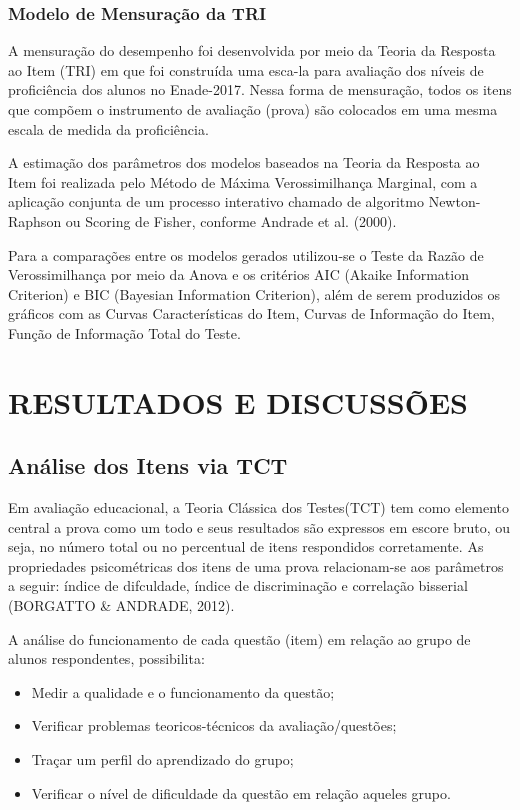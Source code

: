 \documentclass[12pt]{article}
\begin{document}
\subsubsection{Modelo de Mensuração da TRI}

A mensuração do desempenho foi desenvolvida por meio da Teoria da Resposta ao Item (TRI) em que foi construída uma esca-la para avaliação dos níveis de proficiência dos alunos no Enade-2017. Nessa forma de mensuração, todos os itens que compõem o instrumento de avaliação (prova) são colocados em uma mesma escala de medida da proficiência.

A estimação dos parâmetros dos modelos baseados na Teoria da Resposta ao Item foi realizada pelo Método de Máxima Verossimilhança Marginal, com a aplicação conjunta de um processo interativo chamado de algoritmo Newton-Raphson ou Scoring de Fisher, conforme Andrade et al. (2000).\vskip0.3cm

Para a comparações entre os modelos gerados utilizou-se o Teste da Razão de Verossimilhança por meio da Anova e os critérios AIC (Akaike Information Criterion) e BIC (Bayesian Information Criterion), além de serem produzidos os gráficos com as Curvas Características do Item, Curvas de Informação do Item, Função de Informação Total do Teste.\vskip0.3cm







\section{RESULTADOS E DISCUSSÕES}
\subsection{Análise dos Itens via TCT}

Em avaliação educacional, a Teoria Clássica dos Testes(TCT) tem como elemento central a prova como um todo e seus resultados são expressos em escore bruto, ou seja, no número total ou no percentual de itens respondidos corretamente. As propriedades psicométricas dos itens de uma prova relacionam-se aos parâmetros a seguir: índice de difculdade, índice de discriminação e correlação bisserial (BORGATTO \& ANDRADE, 2012).

A análise do funcionamento de cada questão (item) em relação ao grupo de alunos respondentes, possibilita: 

\begin{itemize}
    \item Medir a qualidade e o funcionamento da questão;
    \item Verificar problemas teoricos-técnicos da avaliação/questões; 
    \item Traçar um perfil do aprendizado do grupo;
    \item Verificar o nível de dificuldade da questão em relação aqueles grupo.
\end{itemize} 
 
\end{document}

